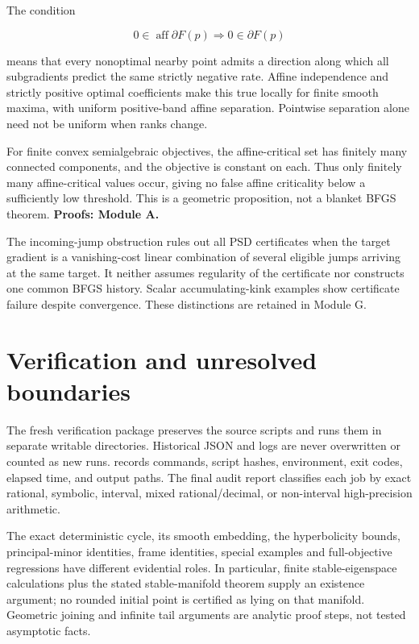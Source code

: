 The condition

\[0\in\operatorname{aff}\partial F(p)\Longrightarrow0\in\partial F(p)\]

means that every nonoptimal nearby point admits a direction along which all subgradients predict the same strictly negative rate. Affine independence and strictly positive optimal coefficients make this true locally for finite smooth maxima, with uniform positive-band affine separation. Pointwise separation alone need not be uniform when ranks change.

For finite convex semialgebraic objectives, the affine-critical set has finitely many connected components, and the objective is constant on each. Thus only finitely many affine-critical values occur, giving no false affine criticality below a sufficiently low threshold. This is a geometric proposition, not a blanket BFGS theorem. \textbf{Proofs: Module A.}

The incoming-jump obstruction rules out all PSD certificates when the target gradient is a vanishing-cost linear combination of several eligible jumps arriving at the same target. It neither assumes regularity of the certificate nor constructs one common BFGS history. Scalar accumulating-kink examples show certificate failure despite convergence. These distinctions are retained in Module G.

\section{Verification and unresolved boundaries}\label{verification-and-unresolved-boundaries}

The fresh verification package preserves the source scripts and runs them in separate writable directories. Historical JSON and logs are never overwritten or counted as new runs.  records commands, script hashes, environment, exit codes, elapsed time, and output paths. The final audit report classifies each job by exact rational, symbolic, interval, mixed rational/decimal, or non-interval high-precision arithmetic.

The exact deterministic cycle, its smooth embedding, the hyperbolicity bounds, principal-minor identities, frame identities, special examples and full-objective regressions have different evidential roles. In particular, finite stable-eigenspace calculations plus the stated stable-manifold theorem supply an existence argument; no rounded initial point is certified as lying on that manifold. Geometric joining and infinite tail arguments are analytic proof steps, not tested asymptotic facts.

